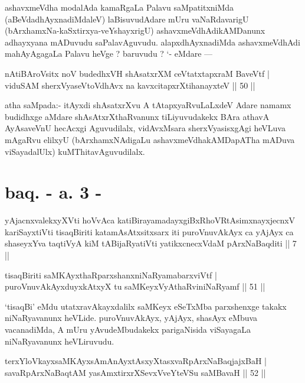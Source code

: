 \begin{artha}
ashavxmeVdha modalAda kamaRgaLa Palavu saMpatitxniMda (aBeVdadhAyxnadiMdaleV) laBisuvudAdare mUru vaNaRdavarigU (bArxhamxNa-kaSxtirxya-veYshayxrigU) ashavx\-meVdhAdikAMDanunx adhayxyana mADuvudu saPalavAguvudu. alapxdhAyxnadiMda ashavxmeVdhAdi mahAyAgagaLa Palavu heVge ? baruvudu ? `- eMdare ---
\end{artha}

\begin{shl}
nAtiBAroV\s sitx noV budedhxVH shAsatxrXM ceVtatxtapxraM BaveVtf |\\
viduSAM sherxVyaseV\s toV\s dhAvx na kavxcitapxrXtihanayxteV \hfill || 50 ||
\end{shl}

\begin{artha}
atha saMpada:- itAyxdi shAsatxrXvu A tAtapxyaRvuLaLxdeV Adare namamx budidhxge \break aMdare shAsAtxrXthaRvanunx tiLiyuvudakekx BAra athavA AyAsaveVnU hecAcxgi Agu\-vudilalx, vidAvxMsara sherxVyasisxgAgi heVLuva mAgaRvu elilxyU (bArxhamxNAdigaLu ashavxmeVdhakAMDapATha mADuva viSayadalUlx) kuMThitavAguvudilalx.
\end{artha}

\section*{baq. - a. 3 -}

\begin{shl}
yAjacnxvalekxyXVti hoVvAca katiBirayamadayxgiBxRhoVRtAsimxnayxjecnxV kariSayxtiVti tisaqBiriti katamAsAtxsitxsarx iti puroVnuvAkAyx ca yAjAyx ca shaseyxYva taqtiVyA kiM tABijaRyatiVti yatikxcnecxVdaM pArxNaBaqditi || 7 ||
\end{shl}


\begin{shl}
tisaqBiriti saMKAyxthaRparxshanxniNaRyamabarxviVtf |\\
puroVnuvAkAyxduyxkAtxyX tu saMKeyxVyAthaRviniNaRyamf \hfill || 51 ||
\end{shl}

\begin{artha}
`tisaqBi' eMdu utatxravAkayxdalilx saMKeyx eSeTxMba parxshenxge takakx niNaRyavanunx heVLide. puroVnuvAkAyx, yAjAyx, shasAyx eMbuva vacanadiMda, A mUru yAvudeMbudakekx parigaNisida viSayagaLa niNaRyavanunx heVLiruvudu.
\end{artha}

\begin{shl}
terxYloVkayxsaMKAyxsAmAnAyxtAsxyXtasxvaRpArxNaBaqjajxBaH |\\
savaRpArxNaBaqtAM yasAmxtirxrXSevxVveYteVSu saMBavaH \hfill || 52 ||
\end{shl}

